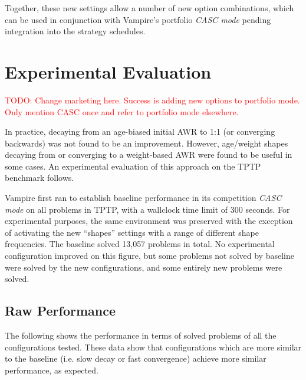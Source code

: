 \documentclass{llncs}
\newcommand{\todo}[1]{\textcolor{red}{TODO: #1}}
\begin{document}
Together, these new settings allow a number of new option combinations, which can be used in conjunction with Vampire's portfolio \emph{CASC mode} pending integration into the strategy schedules.

\section{Experimental Evaluation} \label{sec:experiments}

\todo{Change marketing here. Success is adding new options to portfolio mode. Only mention CASC once and refer to portfolio mode elsewhere.}

In practice, decaying from an age-biased initial AWR to 1:1 (or converging backwards) was not found to be an improvement.
However, age/weight shapes decaying from or converging to a weight-based AWR were found to be useful in some cases.
An experimental evaluation of this approach on the TPTP~\cite{tptp} benchmark follows.

Vampire first ran to establish baseline performance in its competition \emph{CASC mode} on all problems in TPTP, with a wallclock time limit of 300 seconds.
For experimental purposes, the same environment was preserved with the exception of activating the new ``shapes'' settings with a range of different shape frequencies.
The baseline solved 13,057 problems in total.
No experimental configuration improved on this figure, but some problems not solved by baseline were solved by the new configurations, and some entirely new problems were solved.

\subsection{Raw Performance}
The following shows the performance in terms of solved problems of all the configurations tested.
These data show that configurations which are more similar to the baseline (i.e. slow decay or fast convergence) achieve more similar performance, as expected.
\end{document}
